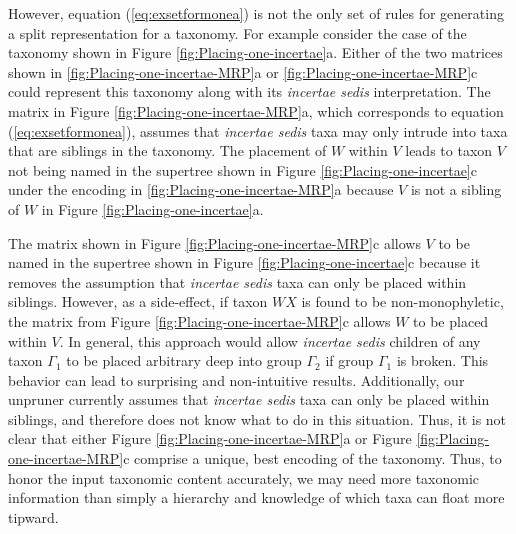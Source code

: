\documentclass[english]{article}
\begin{document}
However, equation (\ref{eq:exsetformonea}) is not the only set of rules 
for generating a split representation for a taxonomy. For example
consider the case of the taxonomy shown in Figure
\ref{fig:Placing-one-incertae}a. Either of the two matrices shown in
\ref{fig:Placing-one-incertae-MRP}a or
\ref{fig:Placing-one-incertae-MRP}c could represent this taxonomy 
along with its \emph{incertae sedis} interpretation.  The matrix in
Figure \ref{fig:Placing-one-incertae-MRP}a, which corresponds to
equation (\ref{eq:exsetformonea}), assumes that \emph{incertae sedis}
taxa may only intrude into taxa that are siblings in the taxonomy.
The placement of $W$ within $V$ leads to taxon $V$ not being named in
the supertree shown in Figure \ref{fig:Placing-one-incertae}c under
the encoding in \ref{fig:Placing-one-incertae-MRP}a because
$V$ is not a sibling of $W$ in Figure \ref{fig:Placing-one-incertae}a.

The matrix shown in Figure \ref{fig:Placing-one-incertae-MRP}c allows
$V$ to be named in the supertree shown in Figure
\ref{fig:Placing-one-incertae}c because it removes the assumption that
\emph{incertae sedis} taxa can only be placed within siblings.
However, as a side-effect, if taxon $WX$ is found to be
non-monophyletic, the matrix from Figure \ref{fig:Placing-one-incertae-MRP}c
allows $W$ to be placed within $V$.  In general, this approach would
allow \emph{incertae sedis} children of any taxon $\Gamma_1$ to be placed
arbitrary deep into group $\Gamma_2$ if group $\Gamma_1$ is broken. This
behavior can lead to surprising and non-intuitive results. Additionally, our unpruner currently assumes
that \emph{incertae sedis} taxa 
can only be placed within siblings, and therefore does not know what
to do in this situation.  Thus, it is not clear that either Figure
\ref{fig:Placing-one-incertae-MRP}a or Figure
\ref{fig:Placing-one-incertae-MRP}c comprise a unique, best
encoding of the taxonomy.  Thus, to honor the input taxonomic content
accurately, we may need more taxonomic information than simply a
hierarchy and knowledge of which taxa can float more tipward. 
\end{document}
